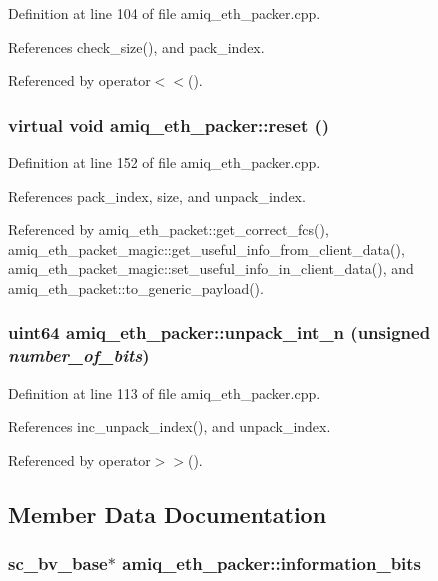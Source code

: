 Definition at line 104 of file amiq\_\-eth\_\-packer.cpp.

References check\_\-size(), and pack\_\-index.

Referenced by operator$<$$<$().\hypertarget{classamiq__eth__packer_a914e685316dcc50d6f722df3f35455c7}{
\subsubsection[{reset}]{\setlength{\rightskip}{0pt plus 5cm}virtual void amiq\_\-eth\_\-packer::reset ()}}
\label{classamiq__eth__packer_a914e685316dcc50d6f722df3f35455c7}


Definition at line 152 of file amiq\_\-eth\_\-packer.cpp.

References pack\_\-index, size, and unpack\_\-index.

Referenced by amiq\_\-eth\_\-packet::get\_\-correct\_\-fcs(), amiq\_\-eth\_\-packet\_\-magic::get\_\-useful\_\-info\_\-from\_\-client\_\-data(), amiq\_\-eth\_\-packet\_\-magic::set\_\-useful\_\-info\_\-in\_\-client\_\-data(), and amiq\_\-eth\_\-packet::to\_\-generic\_\-payload().\hypertarget{classamiq__eth__packer_aefe67bda34ca7585005e3a0fbfc7f9e1}{
\subsubsection[{unpack\_\-int\_\-n}]{\setlength{\rightskip}{0pt plus 5cm}uint64 amiq\_\-eth\_\-packer::unpack\_\-int\_\-n (unsigned {\em number\_\-of\_\-bits})}}
\label{classamiq__eth__packer_aefe67bda34ca7585005e3a0fbfc7f9e1}


Definition at line 113 of file amiq\_\-eth\_\-packer.cpp.

References inc\_\-unpack\_\-index(), and unpack\_\-index.

Referenced by operator$>$$>$().

\subsection{Member Data Documentation}
\hypertarget{classamiq__eth__packer_a5b4237c5e55bc859644dcad30b252738}{
\subsubsection[{information\_\-bits}]{\setlength{\rightskip}{0pt plus 5cm}sc\_\-bv\_\-base$\ast$ {\bf amiq\_\-eth\_\-packer::information\_\-bits}}}
\label{classamiq__eth__packer_a5b4237c5e55bc859644dcad30b252738}



